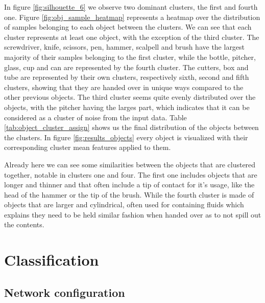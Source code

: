 In figure \ref{fig:silhouette_6} we observe two dominant clusters, the first and fourth one. Figure \ref{fig:obj_sample_heatmap} represents a heatmap over the distribution of samples belonging to each object between the clusters. We can see that each cluster represents at least one object, with the exception of the third cluster. The screwdriver, knife, scissors, pen, hammer, scalpell and brush have the largest majority of their samples belonging to the first cluster, while the bottle, pitcher, glass, cup and can are represented by the fourth cluster. The cutters, box and tube are represented by their own clusters, respectively sixth, second and fifth clusters, showing that they are handed over in unique ways compared to the other previous objects. The third cluster seems quite evenly distributed over the objects, with the pitcher having the larges part, which indicates that it can be considered as a cluster of noise from the input data. Table \ref{tab:object_cluster_assign} shows us the final distribution of the objects between the clusters. In figure \ref{fig:results_objects} every object is visualized with their corresponding cluster mean features applied to them.

Already here we can see some similarities between the objects that are clustered together, notable in clusters one and four. The first one includes objects that are longer and thinner and that often include a tip of contact for it's usage, like the head of the hammer or the tip of the brush. While the fourth cluster is made of objects that are larger and cylindrical, often used for containing fluids which explains they need to be held similar fashion when handed over as to not spill out the contents.



%

\section{Classification}

\subsection{Network configuration}
\label{sec:res_setup}

